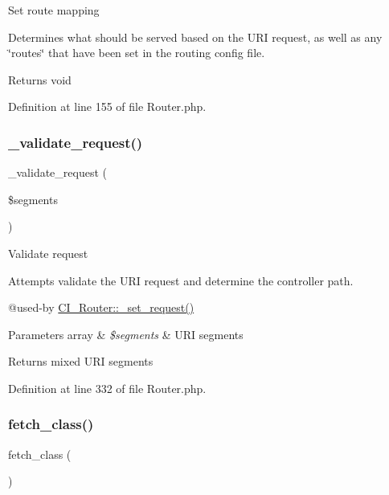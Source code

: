 Set route mapping

Determines what should be served based on the U\+RI request, as well as any \char`\"{}routes\char`\"{} that have been set in the routing config file.

\begin{DoxyReturn}{Returns}
void 
\end{DoxyReturn}


Definition at line 155 of file Router.\+php.

\mbox{\label{class_c_i___router_a488aa4aaa52c36c4e6c791e7bfd76358}} 
\subsubsection{\texorpdfstring{\_validate\_request()}{\_validate\_request()}}
{\footnotesize\ttfamily \+\_\+validate\+\_\+request (\begin{DoxyParamCaption}\item[{}]{\$segments }\end{DoxyParamCaption})\hspace{0.3cm}{\ttfamily [protected]}}

Validate request

Attempts validate the U\+RI request and determine the controller path.

@used-\/by \mbox{\hyperlink{class_c_i___router_a92b8b486926e4dea5fee4d71f80a472a}{C\+I\+\_\+\+Router\+::\+\_\+set\+\_\+request()}} 
\begin{DoxyParams}[1]{Parameters}
array & {\em \$segments} & U\+RI segments \\
\hline
\end{DoxyParams}
\begin{DoxyReturn}{Returns}
mixed U\+RI segments 
\end{DoxyReturn}


Definition at line 332 of file Router.\+php.

\mbox{\label{class_c_i___router_af5586c3f514021e9e2588e102620d237}} 
\subsubsection{\texorpdfstring{fetch\_class()}{fetch\_class()}}
{\footnotesize\ttfamily fetch\+\_\+class (\begin{DoxyParamCaption}{ }\end{DoxyParamCaption})}

